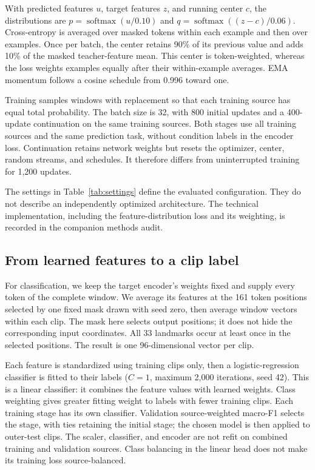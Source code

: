 \documentclass[10pt,twocolumn,letterpaper]{article}
\begin{document}
With predicted features $u$, target features $z$, and running center $c$, the distributions are $p=\operatorname{softmax}(u/0.10)$ and $q=\operatorname{softmax}((z-c)/0.06)$. Cross-entropy is averaged over masked tokens within each example and then over examples. Once per batch, the center retains 90\% of its previous value and adds 10\% of the masked teacher-feature mean. This center is token-weighted, whereas the loss weights examples equally after their within-example averages. EMA momentum follows a cosine schedule from 0.996 toward one.

Training samples windows with replacement so that each training source has equal total probability. The batch size is 32, with 800 initial updates and a 400-update continuation on the same training sources. Both stages use all training sources and the same prediction task, without condition labels in the encoder loss. Continuation retains network weights but resets the optimizer, center, random streams, and schedules. It therefore differs from uninterrupted training for 1,200 updates.

The settings in Table~\ref{tab:settings} define the evaluated configuration. They do not describe an independently optimized architecture. The technical implementation, including the feature-distribution loss and its weighting, is recorded in the companion methods audit.

\subsection{From learned features to a clip label}
For classification, we keep the target encoder's weights fixed and supply every token of the complete window. We average its features at the 161 token positions selected by one fixed mask drawn with seed zero, then average window vectors within each clip. The mask here selects output positions; it does not hide the corresponding input coordinates. All 33 landmarks occur at least once in the selected positions. The result is one 96-dimensional vector per clip.

Each feature is standardized using training clips only, then a logistic-regression classifier is fitted to their labels ($C=1$, maximum 2,000 iterations, seed 42). This is a linear classifier: it combines the feature values with learned weights. Class weighting gives greater fitting weight to labels with fewer training clips. Each training stage has its own classifier. Validation source-weighted macro-F1 selects the stage, with ties retaining the initial stage; the chosen model is then applied to outer-test clips. The scaler, classifier, and encoder are not refit on combined training and validation sources. Class balancing in the linear head does not make its training loss source-balanced.
\end{document}
